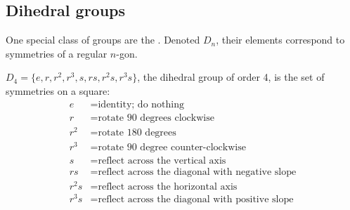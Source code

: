 \documentclass[../algebraNotesMSRI-UP2016.tex]{subfiles}
\begin{document}
\subsection[\subsecname]{Dihedral groups}
\begin{frame}[c]{\subsecname}{}
One special class of groups are the .  Denoted $D_n$, their elements correspond to symmetries of a regular $n$-gon.
\end{frame}

\begin{frame}
\begin{ex}\label{ex:D4}
$D_4=\{e,r,r^2,r^3,s,rs,r^2s,r^3s\}$, the dihedral group of order 4, is the set of symmetries on a square:
\begin{align*}
e &=\text{identity; do nothing} \\
r &=\text{rotate 90 degrees clockwise} \\
r^2 &=\text{rotate 180 degrees} \\
r^3 &=\text{rotate 90 degree counter-clockwise} \\
s &=\text{reflect across the vertical axis} \\
rs &=\text{reflect across the diagonal with negative slope} \\
r^2s &=\text{reflect across the horizontal axis} \\
r^3s &=\text{reflect across the diagonal with positive slope}
\end{align*} 
\end{ex}
\end{frame}
\end{document}
